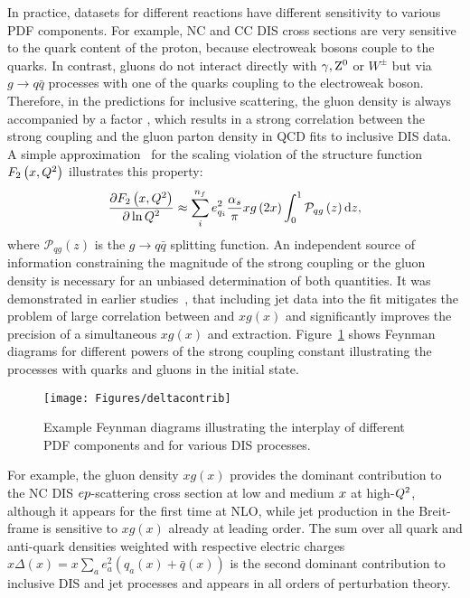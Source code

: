 In practice, datasets for different reactions have different sensitivity to various PDF components. For example, NC and CC DIS cross sections are very sensitive to the quark content of the proton, because electroweak bosons couple to the quarks. In contrast, gluons do not interact directly with $\gamma,\mbox{$\rm{Z}^0$}$ or $W^{\pm}$ but via $g\rightarrow q\bar q$ processes with one of the quarks coupling to the electroweak boson. Therefore, in the predictions for inclusive \ep scattering, the gluon density is always accompanied by a factor \as, which results in a strong correlation between the strong coupling and the gluon parton density in QCD fits to inclusive DIS data. A simple approximation~\cite{Prytz:1993vr} for the scaling violation of the structure function $F_2\left(x,\mbox{${Q^2}$} \right)$ illustrates this property:
\begin{equation}
 \frac{\partial F_2\left(x,\mbox{${Q^2}$} \right)}{\partial \ln \mbox{${Q^2}$}} \approx \sum_i^{n_f}e_{q_i}^2 \frac{\mbox{$\alpha_{s}$}}{\pi} xg\left(2x\right) \int_0^1 \mathcal{P}_{qg}\left(z\right)\mathrm{d}z, 
\end{equation}
where $\mathcal{P}_{qg}\left(z\right)$ is the $g\rightarrow q\bar q$ splitting function. An independent source of information constraining the magnitude of the strong coupling or the gluon density is necessary for an unbiased determination of both quantities. It was demonstrated in earlier studies~\cite{Chekanov:2005nn,H1prelim-11-143,ZEUS-prel-11-010}, that including jet data into the fit mitigates the problem of large correlation between \as and $xg\left(x\right)$ and significantly improves the precision of a simultaneous $xg\left(x\right)$ and \as extraction. Figure~\ref{fig:pdfcontributions} shows Feynman diagrams for different powers of the strong coupling constant illustrating the processes with quarks and gluons in the initial state.
\begin{figure}[tp]
 \centering
 \begin{center}
 \texttt{[image: Figures/deltacontrib]}
\end{center}
 \caption{Example Feynman diagrams illustrating the interplay of different PDF components and \as for various DIS processes.}
 \label{fig:pdfcontributions}
\end{figure}
For example, the gluon density $xg\left(x\right)$ provides the dominant contribution to the NC DIS $\mbox{$e p$}$-scattering cross section at low and medium $\mbox{${x}$}$ at high-$\mbox{${Q^2}$}$, although it appears for the first time at NLO, while jet production in the Breit-frame is sensitive to $xg\left(x\right)$ already at leading order. The sum over all quark and anti-quark densities weighted with respective electric charges $x\Delta\left(x\right)=x\sum_{a}{e_a^2\left(q_a\left(x\right)+\bar{q}\left(x\right)\right)}$ is the second dominant contribution to inclusive DIS and jet processes and appears in all orders of perturbation theory.

